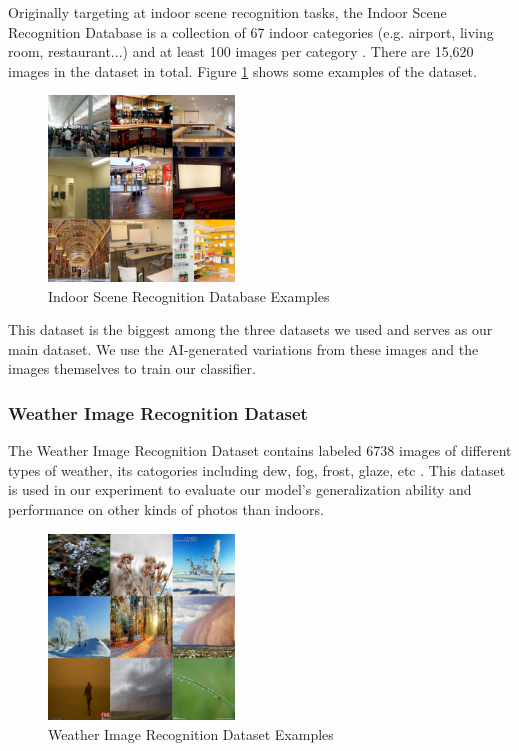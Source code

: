 \documentclass[11pt]{article}
\begin{document}
Originally targeting at indoor scene recognition tasks, the Indoor Scene Recognition Database is a collection of 67 indoor categories (e.g. airport, living room, restaurant...) and at least 100 images per category \cite{quattoni2009recognizing}. There are 15,620 images in the dataset in total. Figure \ref{fig:paper_indoor_dataset} shows some examples of the dataset.

\begin{figure}[h]
  \centering
  \includegraphics[width=140pt]{./assets/paper_indoor_dataset.jpg}
  \caption{Indoor Scene Recognition Database Examples}
  \label{fig:paper_indoor_dataset}
\end{figure}

This dataset is the biggest among the three datasets we used and serves as our main dataset. We use the AI-generated variations from these images and the images themselves to train our classifier.

\subsubsection{Weather Image Recognition Dataset}

The Weather Image Recognition Dataset contains labeled 6738 images of different types of weather, its catogories including dew, fog, frost, glaze, etc \cite{DVN/M8JQCR_2021}. This dataset is used in our experiment to evaluate our model's generalization ability and performance on other kinds of photos than indoors.

\begin{figure}[h]
  \centering
  \includegraphics[width=140pt]{./assets/paper_weather_dataset.jpg}
  \caption{Weather Image Recognition Dataset Examples}
  \label{fig:paper_weather_dataset}
\end{figure}
\end{document}
